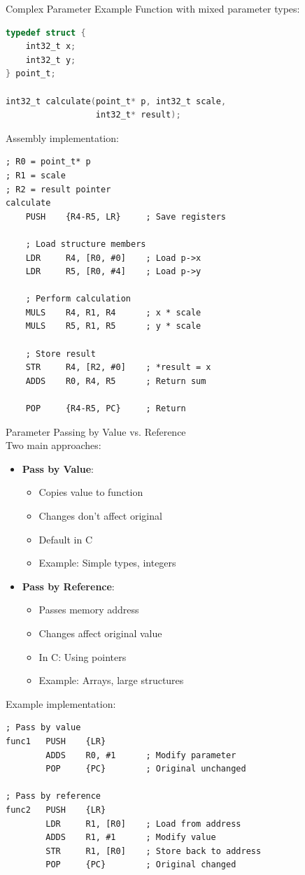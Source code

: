\begin{example2}{Complex Parameter Example}
Function with mixed parameter types:
\begin{lstlisting}[language=C, style=base]
typedef struct {
    int32_t x;
    int32_t y;
} point_t;

int32_t calculate(point_t* p, int32_t scale, 
                  int32_t* result);
\end{lstlisting}

Assembly implementation:
\begin{lstlisting}[language=armasm, style=base]
; R0 = point_t* p
; R1 = scale
; R2 = result pointer
calculate
    PUSH    {R4-R5, LR}     ; Save registers
    
    ; Load structure members
    LDR     R4, [R0, #0]    ; Load p->x
    LDR     R5, [R0, #4]    ; Load p->y
    
    ; Perform calculation
    MULS    R4, R1, R4      ; x * scale
    MULS    R5, R1, R5      ; y * scale
    
    ; Store result
    STR     R4, [R2, #0]    ; *result = x
    ADDS    R0, R4, R5      ; Return sum
    
    POP     {R4-R5, PC}     ; Return
\end{lstlisting}
\end{example2}

\begin{KR}{Parameter Passing by Value vs. Reference}\\
Two main approaches:
\begin{itemize}
  \item \textbf{Pass by Value}:
    \begin{itemize}
      \item Copies value to function
      \item Changes don't affect original
      \item Default in C
      \item Example: Simple types, integers
    \end{itemize}
  \item \textbf{Pass by Reference}:
    \begin{itemize}
      \item Passes memory address
      \item Changes affect original value
      \item In C: Using pointers
      \item Example: Arrays, large structures
    \end{itemize}
\end{itemize}

Example implementation:
\begin{lstlisting}[language=armasm, style=base]
; Pass by value
func1   PUSH    {LR}
        ADDS    R0, #1      ; Modify parameter
        POP     {PC}        ; Original unchanged

; Pass by reference
func2   PUSH    {LR}
        LDR     R1, [R0]    ; Load from address
        ADDS    R1, #1      ; Modify value
        STR     R1, [R0]    ; Store back to address
        POP     {PC}        ; Original changed
\end{lstlisting}
\end{KR}

